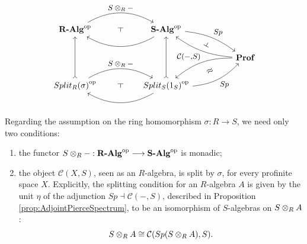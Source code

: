 \begin{equation}
    \begin{tikzcd}[every label/.append style = {font = \small}]
        \opcat{\textbf{R-Alg}} \arrow[rr, "S\tens{R}-", bend left, ""{name=pull}] & & \opcat{\textbf{S-Alg}} \arrow[ll, bend left, ""{name=comp}] \arrow[rrd, "Sp", bend left=15, ""{name=Sps}] \\ & & & & \textbf{Prof} \arrow[llu, "\mathcal{C}(-{,}S)", bend left=15, ""{name=Cs}] \arrow[dll, bend right=20, ""{name=Csequi}] \\ \opcat{Split_R(\sigma)} \arrow[uu, tail] \arrow[rr, "S\tens{R}-", bend left, ""{name=pullres}] & & \opcat{Split_S(1_S)} \arrow[uu, tail] \arrow[urr, bend right=20, "Sp"', ""{name=Spsequi}] \arrow[ll, bend left, ""{name=compres}] \arrow[phantom, from=pull, to=comp, "\dashv" rotate=90] \arrow[phantom, from=pullres, to=compres, "\dashv" rotate=90] \arrow[phantom, from=Sps, to=Cs, "\dashv" rotate=-120] \arrow[phantom, from=Spsequi, to=Csequi, "\approx" rotate=30]
    \end{tikzcd}
\end{equation}

Regarding the assumption on the ring homomorphism $\sigma:R\to S$, we need only two conditions:
\begin{enumerate}
    \item the functor $S\otimes_{R}-:{\textbf{R-Alg}}^{\mathrm{op}}\longrightarrow{\textbf{S-Alg}}^{\mathrm{op}}$ is monadic;
    \item the object $\mathcal{C}(X,S)$, seen as an $R$-algebra, is split by $\sigma$, for every profinite space $X$. Explicitly, the splitting condition for an $R$-algebra $A$ is given by the unit $\eta$ of the adjunction $Sp\dashv\mathcal{C}(-,S)$, described in Proposition \ref{prop:AdjointPierceSpectrum}, to be an isomorphism of $S$-algebras on $S\otimes_{R}A$:
    \[ S\otimes_{R}A \cong \mathcal{C}(Sp(S\otimes_{R}A), S). \]
\end{enumerate}

